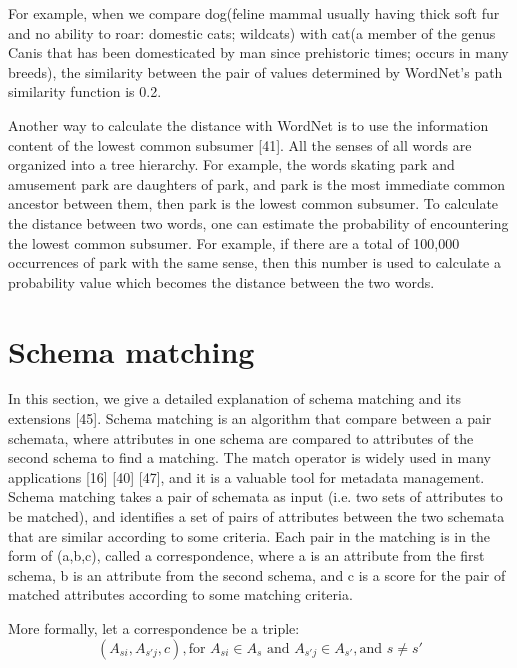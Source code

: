 For example, when we compare dog(feline mammal usually having thick soft fur and no ability to roar: domestic cats; wildcats) with cat(a member of the genus Canis that has been domesticated by man since prehistoric times; occurs in many breeds), the similarity between the pair of values determined by WordNet's path similarity function is 0.2.

Another way to calculate the distance with WordNet is to use the information content of the lowest common subsumer \cite{Resnik1970Using}[41]. All the senses of all words are organized into a tree hierarchy. For example, the words skating park and amusement park are daughters of park, and park is the most immediate common ancestor between them, then park is the lowest common subsumer. To calculate the distance between two words, one can estimate the probability of encountering the lowest common subsumer. For example, if there are a total of 100,000 occurrences of park with the same sense, then this number is used to calculate a probability value which becomes the distance between the two words.

\section{Schema matching}
\label{sec:SchemaMatching}

In this section, we give a detailed explanation of schema matching and its extensions \cite{Sorrentino2011NORMS}[45]. Schema matching is an algorithm that compare between a pair schemata, where attributes in one schema are compared to attributes of the second schema to find a matching. The match operator is widely used in many applications \cite{Dong2012Proceedings}[16] \cite{Rahm2001Survey}[40] \cite{10.1145/3183713.3183729}[47], and it is a valuable tool for metadata management. Schema matching takes a pair of schemata as input (i.e. two sets of attributes to be matched), and identifies a set of pairs of attributes between the two schemata that are similar according to some criteria. Each pair in the matching is in the form of (a,b,c), called a correspondence, where a is an attribute from the first schema, b is an attribute from the second schema, and c is a score for the pair of matched attributes according to some matching criteria.

More formally, let a correspondence be a triple:
\[
(A_{si},A_{s'j},c),\text{for }A_{si}\in A_{s}\text{ and }A_{s'j}\in A_{s'},\text{and }s\neq s'
\]

